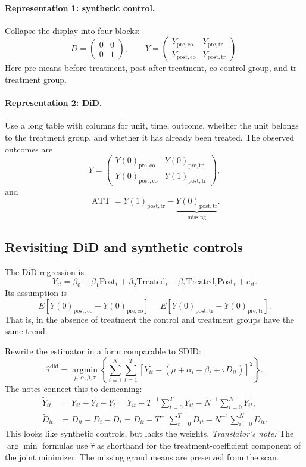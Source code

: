 \paragraph{Representation 1: synthetic control.}
Collapse the display into four blocks:
\[
D=\begin{pmatrix}0&0\\0&1\end{pmatrix},\qquad
Y=\begin{pmatrix}
Y_{\mathrm{pre,co}}&Y_{\mathrm{pre,tr}}\\
Y_{\mathrm{post,co}}&Y_{\mathrm{post,tr}}
\end{pmatrix}.
\]
Here pre means before treatment, post after treatment, co control group, and tr treatment group.
\paragraph{Representation 2: DiD.}
Use a long table with columns for unit, time, outcome, whether the unit belongs to the treatment group, and whether it has already been treated.
The observed outcomes are
\[
Y=\begin{pmatrix}
Y(0)_{\mathrm{pre,co}}&Y(0)_{\mathrm{pre,tr}}\\
Y(0)_{\mathrm{post,co}}&Y(1)_{\mathrm{post,tr}}
\end{pmatrix},
\]
and
\[
\operatorname{ATT}=Y(1)_{\mathrm{post,tr}}
-\underbrace{Y(0)_{\mathrm{post,tr}}}_{\text{missing}}.
\]

\subsection{Revisiting DiD and synthetic controls}
The DiD regression is
\[
Y_{it}=\beta_0+\beta_1\mathrm{Post}_t+\beta_2\mathrm{Treated}_i
+\beta_3\mathrm{Treated}_i\mathrm{Post}_t+e_{it}.
\]
Its assumption is
\[
E[Y(0)_{\mathrm{post,co}}-Y(0)_{\mathrm{pre,co}}]
=E[Y(0)_{\mathrm{post,tr}}-Y(0)_{\mathrm{pre,tr}}].
\]
That is, in the absence of treatment the control and treatment groups have the same trend.

Rewrite the estimator in a form comparable to SDID:
\[
\widehat\tau^{\mathrm{did}}
=\operatorname*{argmin}_{\mu,\alpha,\beta,\tau}
\left\{\sum_{i=1}^{N}\sum_{t=1}^{T}
[Y_{it}-(\mu+\alpha_i+\beta_t+\tau D_{it})]^2\right\}.
\]
The notes connect this to demeaning:
\begin{align*}
\widetilde Y_{it}
&=Y_{it}-\overline Y_i-\overline Y_t
=Y_{it}-T^{-1}\sum_{t=0}^{T}Y_{it}-N^{-1}\sum_{i=0}^{N}Y_{it},\\
\widetilde D_{it}
&=D_{it}-\overline D_i-\overline D_t
=D_{it}-T^{-1}\sum_{t=0}^{T}D_{it}-N^{-1}\sum_{i=0}^{N}D_{it}.
\end{align*}
This looks like synthetic controls, but lacks the weights.
\textit{Translator's note:} The \(\arg\min\) formulas use \(\widehat\tau\) as shorthand for the treatment-coefficient component of the joint minimizer. The missing grand means are preserved from the scan.

